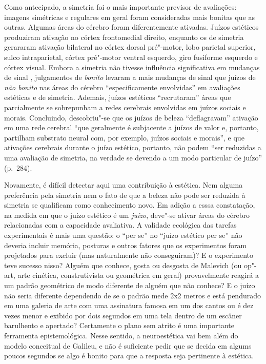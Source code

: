 Como antecipado, a simetria foi o mais importante previsor de
avaliações: imagens simétricas e regulares em geral foram consideradas
mais bonitas que as outras. Algumas áreas do cérebro foram
diferentemente ativadas. Juízos estéticos produziram ativação no córtex
frontomedial direito, enquanto os de simetria gerararam ativação
bilateral no córtex dorsal pré"-motor, lobo parietal superior, sulco
intraparietal, córtex pré"-motor ventral esquerdo, giro fusiforme
esquerdo e córtex visual. Embora a simetria não tivesse influência
significativa em mudanças de sinal , julgamentos de \emph{bonito}
levaram a mais mudanças de sinal que juízos de \emph{não bonito} nas
áreas do cérebro ``especificamente envolvidas'' em avaliações estéticas
e de simetria. Ademais, juízos estéticos ``recrutaram'' áreas que
parcialmente se sobrepunham a redes cerebrais envolvidas em juízos
sociais e morais. Concluindo, descobriu"-se que os juízos de beleza
``deflagravam'' ativação em uma rede cerebral ``que geralmente é
subjacente a juízos de valor e, portanto, partilham substrato neural
com, por exemplo, juízos sociais e morais'', e que ativações cerebrais
durante o juízo estético, portanto, não podem ``ser reduzidas a uma
avaliação de simetria, na verdade se devendo a um modo particular de
juízo'' (p.~284).

Novamente, é difícil detectar aqui uma contribuição à estética. Nem
alguma preferência pela simetria nem o fato de que a beleza não pode ser
reduzida à simetria se qualificam como conhecimento novo. Em adição a
esssa constatação, na medida em que o juízo estético é um \emph{juízo},
deve"-se ativar áreas do cérebro relacionadas com a capacidade
avaliativa. A validade ecológica das tarefas experimentais é mais uma
questão: o ``per se'' no ``juízo estético per se'' não deveria incluir
memória, posturas e outros fatores que os experimentos foram projetados
para excluir (mas naturalmente não conseguiram)? E o experimento teve
sucesso nisso? Alguém que conhece, gosta ou desgosta de Malevich (ou
op"-art, arte cinética, construtivista ou geométrica em geral)
provavelmente reagirá a um padrão geométrico de modo diferente de alguém
que não conhece? E o juízo não seria diferente dependendo de se o padrão
mede 2x2 metros e está pendurado em uma galeria de arte com uma
assinatura famosa em um dos cantos ou é dez vezes menor e exibido por
dois segundos em uma tela dentro de um escâner barulhento e apertado?
Certamente o plano sem atrito é uma importante ferramenta
epistemológica. Nesse sentido, a neuroestética vai bem além do modelo
conceitual de Galileu, e não é suficiente pedir que se decida em algums
poucos segundos se algo é bonito para que a resposta seja pertinente à
estética.

